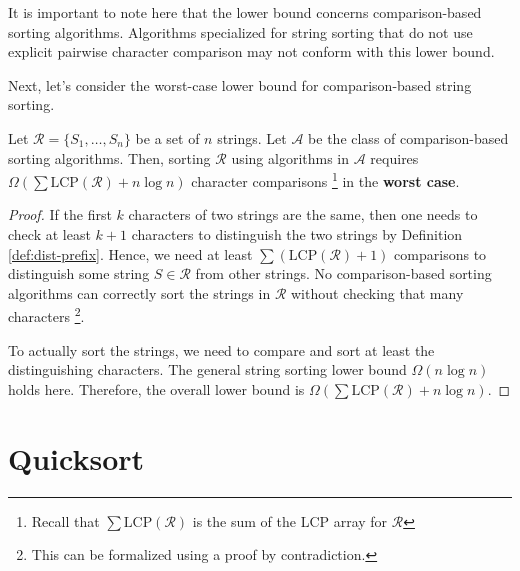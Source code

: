 It is important to note here that the lower bound concerns comparison-based sorting algorithms. Algorithms specialized for string sorting that do not use explicit pairwise character comparison may not conform with this lower bound.

Next, let's consider the worst-case lower bound for comparison-based string sorting.

\begin{theorem}
    Let $\mathcal{R} = \{S_1,\ldots,S_n\}$ be a set of $n$ strings. Let $\mathcal{A}$ be the class of comparison-based sorting algorithms. Then, sorting $\mathcal{R}$ using algorithms in $\mathcal{A}$ requires $\Omega(\sum \mathrm{LCP}(\mathcal{R}) + n \log n)$ character comparisons \footnote{Recall that $\sum \mathrm{LCP}(\mathcal{R})$ is the sum of the LCP array for $\mathcal{R}$} in the \textbf{worst case}.
\end{theorem}

\begin{proof}
    If the first $k$ characters of two strings are the same, then one needs to check at least $k+1$ characters to distinguish the two strings by Definition \ref{def:dist-prefix}. Hence, we need at least $\sum (\mathrm{LCP}(\mathcal{R}) + 1)$ comparisons to distinguish some string $S \in \mathcal{R}$ from other strings. No comparison-based sorting algorithms can correctly sort the strings in $\mathcal{R}$ without checking that many characters \footnote{This can be formalized using a proof by contradiction.}.

    To actually sort the strings, we need to compare and sort at least the distinguishing characters. The general string sorting lower bound $\Omega(n \log n)$ holds here. Therefore, the overall lower bound is $\Omega(\sum \mathrm{LCP}(\mathcal{R}) + n \log n)$.
\end{proof}

\section{Quicksort}

